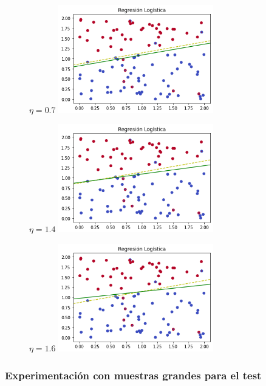 \documentclass{article}
\begin{document}
    \begin{figure}
        \centering
        $\eta = 0.7$
        \includegraphics[width=0.6\textwidth]{rl4.png}
    \end{figure}

    \begin{figure}
        \centering
        $\eta = 1.4$
        \includegraphics[width=0.6\textwidth]{rl5.png}
    \end{figure}

    \begin{figure}
        \centering
        $\eta = 1.6$
        \includegraphics[width=0.6\textwidth]{rl6.png}
    \end{figure}

    \pagebreak
    \pagebreak

    \subsubsection{Experimentación con muestras grandes para el test}
\end{document}
